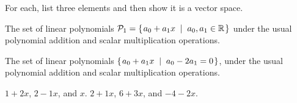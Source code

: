 
\begin{Exercise}[
name={},
title={}, 
difficulty=0,
origin={\cite{JH}}]
For each, list three elements and then show it is a vector space.

\Question The set of linear polynomials
        \( \mathcal{P}_1=\mbox{$\left\{\hspace{0.1em}a_0+a_1x\;\;\middle|\;\; a_0,a_1\in\mathbb{R}\hspace{0.1em}\right\}$} \) under the
        usual polynomial addition and scalar multiplication operations.

\Question The set of linear polynomials
        \( \mbox{$\left\{\hspace{0.1em}a_0+a_1x\;\;\middle|\;\; a_0-2a_1=0\hspace{0.1em}\right\}$} \), under the
        usual polynomial addition and scalar multiplication operations.

\end{Exercise}

\begin{Answer}
\Question $1+2x$, $2-1x$, and $x$.
\Question $2+1x$, $6+3x$, and $-4-2x$.


\end{Answer}
